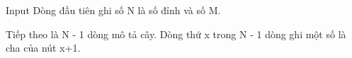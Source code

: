 Input
Dòng đầu tiên ghi số N là số đỉnh và số M.

Tiếp theo là N - 1 dòng mô tả cây. Dòng thứ x trong N - 1 dòng ghi một số là cha của nút x+1.